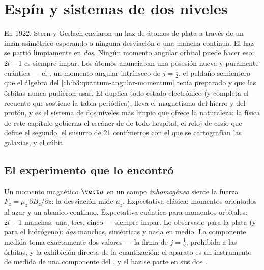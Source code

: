 \chapter{Espín y sistemas de dos niveles}\label{ch:b3:spin-two-level}

En 1922, Stern y Gerlach enviaron un haz de átomos de plata a través de un
imán asimétrico esperando o ninguna desviación o una mancha continua. El haz
se partió limpiamente en \emph{dos}. Ningún momento angular orbital puede
hacer eso: $2l + 1$ es siempre impar. Los átomos anunciaban una posesión
nueva y puramente cuántica --- el \emph{}, un momento angular
intrínseco de $j = \tfrac12$, el peldaño semientero que el álgebra del
\cref{ch:b3:quantum-angular-momentum} tenía preparado y que las órbitas
nunca pudieron usar. El  duplica todo estado electrónico (y completa el
recuento que sostiene la tabla periódica), lleva el magnetismo del hierro y
del protón, y es el sistema de dos niveles más limpio que ofrece la
naturaleza: la física de este capítulo gobierna el escáner de  de todo hospital, el reloj de cesio que define el segundo, el
susurro de 21 centímetros con el que se cartografían las galaxias, y el cúbit.

\section{El experimento que lo encontró}

\begin{example}\label{ex:b3:spin-two-level:stern-gerlach}
Un momento magnético $\vect\mu$ en un campo \emph{inhomogéneo} siente
la fuerza $F_z = \mu_z\,\partial B_z/\partial z$: la desviación
mide $\mu_z$. Expectativa clásica: momentos orientados al azar y
un abanico continuo. Expectativa cuántica para momentos orbitales: $2l + 1$
manchas: una, tres, cinco --- siempre impar. Lo observado para la plata (y
para el hidrógeno): \emph{dos} manchas, simétricas y nada en medio. La
componente medida toma exactamente dos valores --- la firma de $j
= \tfrac12$, prohibida a las órbitas, y la exhibición directa de la
cuantización: el aparato es un instrumento de medida de una componente del
, y el haz se parte en sus dos .
\end{example}


